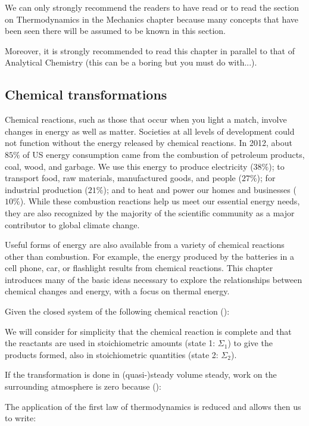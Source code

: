 	We can only strongly recommend the readers to have read or to read the section on Thermodynamics in the Mechanics chapter because many concepts that have been seen there will be assumed to be known in this section.
	
	Moreover, it is strongly recommended to read this chapter in parallel to that of Analytical Chemistry (this can be a boring but you must do with...).
	
	\subsection{Chemical transformations}
	Chemical reactions, such as those that occur when you light a match, involve changes in energy as well as matter. Societies at all levels of development could not function without the energy released by chemical reactions. In 2012, about $85\%$ of US energy consumption came from the combustion of petroleum products, coal, wood, and garbage. We use this energy to produce electricity ($38\%$); to transport food, raw materials, manufactured goods, and people ($27\%$); for industrial production ($21\%$); and to heat and power our homes and businesses ($10\%$). While these combustion reactions help us meet our essential energy needs, they are also recognized by the majority of the scientific community as a major contributor to global climate change.

	Useful forms of energy are also available from a variety of chemical reactions other than combustion. For example, the energy produced by the batteries in a cell phone, car, or flashlight results from chemical reactions. This chapter introduces many of the basic ideas necessary to explore the relationships between chemical changes and energy, with a focus on thermal energy.

	Given the closed system of the following chemical reaction ():
	
	We will consider for simplicity that the chemical reaction is complete and that the reactants are used in stoichiometric amounts (state 1: $\Sigma_1$) to give the products formed, also in stoichiometric quantities (state 2: $\Sigma_2$).
	
	If the transformation is done in (quasi-)steady volume steady, work on the surrounding atmosphere is zero because ():
	
	The application of the first law of thermodynamics is reduced and allows then us to write:
	
